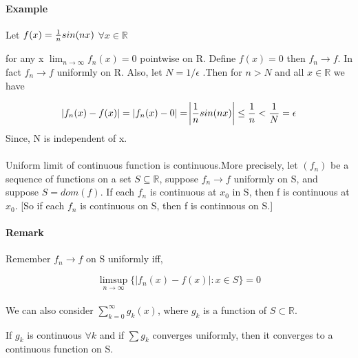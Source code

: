 \documentclass{notes}
\begin{document}
\paragraph{Example}


Let $f(x) = {1 \over n} sin(nx)$ $\forall x \in \mathbb{R}$

for any x $\lim_{n \to  \infty} f_n(x) = 0$ pointwise on R. Define $f(x) = 0$ then $f_n \to f$. In fact $f_n \to f$ uniformly on R. Also, let $N = 1/\epsilon$ .Then for $n>N$ and all $x \in \mathbb{R}$ we have

$$ |f_n(x) - f(x)| = |f_n(x) - 0| = \abs{{1 \over n}sin(nx)} \leq {1 \over n} <{1 \over N} = \epsilon$$
Since, N is independent of x.

\paragraph{}

\begin{theorem}{}
	Uniform limit of continuous function is continuous.More precisely, let $(f_n)$ be a sequence of functions on a set $S\subseteq \mathbb{R}$, suppose $f_n\to f$ uniformly on S, and suppose $S = dom(f)$. If each $f_n$ is
	continuous at $x_0$ in S, then f is continuous at $x_0$. [So if each $f_n$ is continuous on S, then f is continuous on S.]
\end{theorem}
\paragraph{Remark} Remember $f_n \to f$ on S uniformly iff,

$$ \limsup \limits_{n \to \infty} \{|f_n(x) - f(x)|: x \in S\} = 0$$
\paragraph{}

We can also consider $\sum_{k = 0}^{\infty} g_k(x)$, where $g_k$ is a function of $S\subset\mathbb{R}$.
\begin{theorem}{}
	If $g_k$ is continuous $\forall k$ and if $\sum g_k$ converges uniformly, then it converges to a continuous function on S.
\end{theorem}
\end{document}
